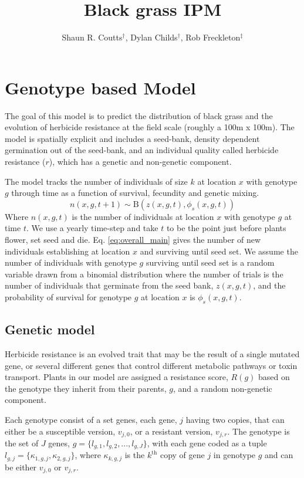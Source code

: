 \documentclass[12pt, a4paper]{article}
\begin{document}
\title{Black grass IPM}
\author{Shaun R. Coutts$^\dag$, Dylan Childs$^\dag$, Rob Freckleton$^\ddag$}
\maketitle

\section{Genotype based Model}
The goal of this model is to predict the distribution of black grass and the evolution of herbicide resistance at the field scale (roughly a 100m x 100m). The model is spatially explicit and includes a seed-bank, density dependent germination out of the seed-bank, and an individual quality called herbicide resistance ($r$), which has a genetic and non-genetic component.  

The model tracks the number of individuals of size $k$ at location $x$ with genotype $g$ through time as a function of survival, fecundity and genetic mixing.
\begin{equation}
	\label{eq:overall_main}
	n(x, g, t + 1) \sim \text{B}(z(x, g, t), \phi_s(x, g, t))	 
\end{equation}
Where $n(x, g, t)$ is the number of individuals at location $x$ with genotype $g$ at time $t$. We use a yearly time-step and take $t$ to be the point just before plants flower, set seed and die. Eq. \ref{eq:overall_main} gives the number of new individuals establishing at location $x$ and surviving until seed set. We assume the number of individuals with genotype $g$ surviving until seed set is a random variable drawn from a binomial distribution where the number of trials is the number of individuals that germinate from the seed bank, $z(x, g, t)$, and the probability of survival for genotype $g$ at location $x$ is $\phi_s(x, g, t)$.  

\subsection*{Genetic model}
Herbicide resistance is an evolved trait that may be the result of a single mutated gene, or several different genes that control different metabolic pathways or toxin transport. Plants in our model are assigned a resistance score, $R(g)$ based on the genotype they inherit from their parents, $g$, and a random non-genetic component. 

Each genotype consist of a set genes, each gene, $j$ having two copies, that can either be a susceptible version, $v_{j,0}$, or a resistant version, $v_{j,r}$. The genotype is the set of $J$ genes, $g = \{l_{g,1}, l_{g,2}, ..., l_{g,J}\}$, with each gene coded as a tuple $l_{g,j} = \{\kappa_{1,g,j}, \kappa_{2,g,j}\}$, where $\kappa_{k,g,j}$ is the $k^{\text{th}}$ copy of gene $j$ in genotype $g$ and can be either $v_{j,0}$ or $v_{j,r}$.  
\end{document}
